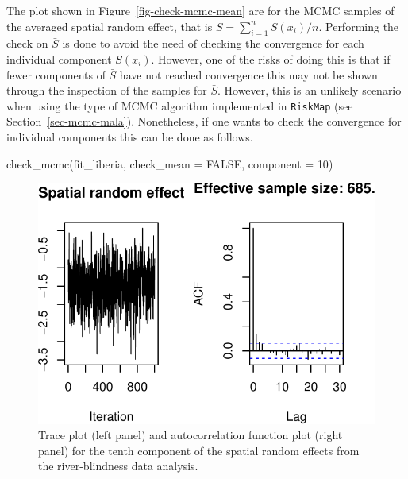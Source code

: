 \documentclass[
  letterpaper,
]{krantz}
\newenvironment{Shaded}{\begin{snugshade}}{\end{snugshade}}
\newcommand{\AttributeTok}[1]{\textcolor[rgb]{0.40,0.45,0.13}{#1}}
\newcommand{\ConstantTok}[1]{\textcolor[rgb]{0.56,0.35,0.01}{#1}}
\newcommand{\DecValTok}[1]{\textcolor[rgb]{0.68,0.00,0.00}{#1}}
\newcommand{\FunctionTok}[1]{\textcolor[rgb]{0.28,0.35,0.67}{#1}}
\newcommand{\NormalTok}[1]{\textcolor[rgb]{0.00,0.23,0.31}{#1}}
\begin{document}
The plot shown in Figure~\ref{fig-check-mcmc-mean} are for the MCMC
samples of the averaged spatial random effect, that is
\(\bar{S} = \sum_{i=1}^n S(x_i) /n\). Performing the check on
\(\bar{S}\) is done to avoid the need of checking the convergence for
each individual component \(S(x_i)\). However, one of the risks of doing
this is that if fewer components of \(\bar{S}\) have not reached
convergence this may not be shown through the inspection of the samples
for \(\bar{S}\). However, this is an unlikely scenario when using the
type of MCMC algorithm implemented in \texttt{RiskMap} (see
Section~\ref{sec-mcmc-mala}). Nonetheless, if one wants to check the
convergence for individual components this can be done as follows.

\begin{Shaded}
\begin{Highlighting}[]
\FunctionTok{check\_mcmc}\NormalTok{(fit\_liberia, }\AttributeTok{check\_mean =} \ConstantTok{FALSE}\NormalTok{, }\AttributeTok{component =} \DecValTok{10}\NormalTok{)}
\end{Highlighting}
\end{Shaded}

\begin{figure}[H]

{\centering \includegraphics{03_model-fitting_files/figure-pdf/fig-check-comp10-mcmc-1.pdf}

}

\caption{\label{fig-check-comp10-mcmc}Trace plot (left panel) and
autocorrelation function plot (right panel) for the tenth component of
the spatial random effects from the river-blindness data analysis.}

\end{figure}
\end{document}
